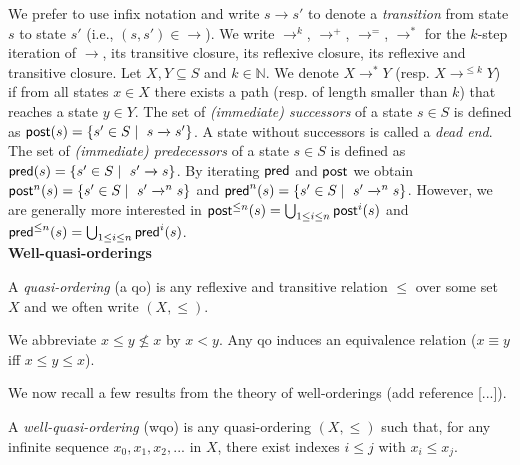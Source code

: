We prefer to use infix notation and write $s \rightarrow s'$ to denote a {\em transition} from state $s$ to state $s'$ (i.e., $ (s,s') \in  {\rightarrow} $).
We write $\rightarrow^{k}$, $\rightarrow^{+}$, $\rightarrow^{=}$, $\rightarrow^{*}$
for the $k$-step iteration of $\rightarrow$, its transitive closure, its reflexive closure, its reflexive and transitive closure.
Let $X,Y \subseteq S$ and $k \in \mathbb{N}$. We denote $X \longrightarrow^{*} Y$ (resp. $X \longrightarrow^{\leq k} Y$) if from all states $x \in X$ there exists a path (resp. of length smaller than $k$) that reaches a state $y \in Y$.
\noindent
The set of {\em (immediate) successors} of a state $s \in S$ is defined as 
 $\textsf{post}(s) = \{ s' \in S \mid  ~ s \xrightarrow{} s'\}$. 
A state without successors is called a {\em dead end}. 
The set of {\em (immediate) predecessors} of a state $s \in S$ is deﬁned as
 $\textsf{pred}(s) = \{ s' \in S \mid  ~ s' \xrightarrow{} s\}$. 
By iterating $\textsf{pred}$ and $\textsf{post}$ we obtain  
$\textsf{post}^n(s) = \{ s' \in S \mid  ~ s' \xrightarrow{}^n s\}$
and
$\textsf{pred}^n(s) = \{ s' \in S \mid  ~ s' \xrightarrow{}^n s\}$.
However, we are generally more interested in
$\textsf{post}^{\leq n}(s) = \bigcup_{1 \leq i \leq n} \textsf{post}^i(s)$
and
$\textsf{pred}^{\leq n}(s) = \bigcup_{1 \leq i \leq n} \textsf{pred}^i(s)$. \\



%

\noindent
{\bf Well-quasi-orderings}

A {\em quasi-ordering} (a qo) is any reflexive and transitive relation $\leq$ over some set $X$ and we often write $(X,\leq)$.

We abbreviate $x \leq y \not\leq x$ by $x < y$.
Any qo induces an equivalence relation ($x \equiv y$ iff $x \leq y \leq x$).

We now recall a few results from the theory of well-orderings (add reference [...]).


\begin{definition}
 A {\em well-quasi-ordering} (wqo) is any quasi-ordering $(X,\leq)$ such that, for any infinite sequence $x_0, x_1, x_2, ...$ in $X$, there exist indexes $i \leq j$ with $x_i \leq  x_j$.
\end{definition}


